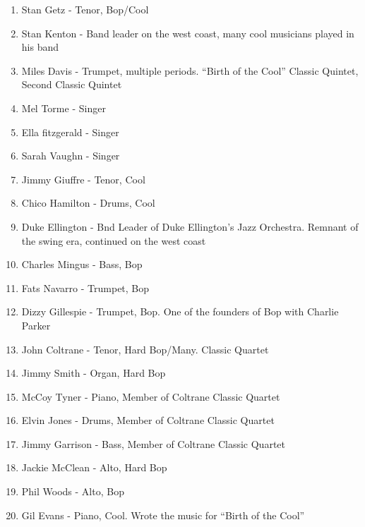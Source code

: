 \documentclass[]{article}
\begin{document}
\begin{enumerate}
\item
  Stan Getz - Tenor, Bop/Cool
\item
  Stan Kenton - Band leader on the west coast, many cool musicians
  played in his band
\item
  Miles Davis - Trumpet, multiple periods. ``Birth of the Cool'' Classic
  Quintet, Second Classic Quintet
\item
  Mel Torme - Singer
\item
  Ella fitzgerald - Singer
\item
  Sarah Vaughn - Singer
\item
  Jimmy Giuffre - Tenor, Cool
\item
  Chico Hamilton - Drums, Cool
\item
  Duke Ellington - Bnd Leader of Duke Ellington's Jazz Orchestra.
  Remnant of the swing era, continued on the west coast
\item
  Charles Mingus - Bass, Bop
\item
  Fats Navarro - Trumpet, Bop
\item
  Dizzy Gillespie - Trumpet, Bop. One of the founders of Bop with
  Charlie Parker
\item
  John Coltrane - Tenor, Hard Bop/Many. Classic Quartet
\item
  Jimmy Smith - Organ, Hard Bop
\item
  McCoy Tyner - Piano, Member of Coltrane Classic Quartet
\item
  Elvin Jones - Drums, Member of Coltrane Classic Quartet
\item
  Jimmy Garrison - Bass, Member of Coltrane Classic Quartet
\item
  Jackie McClean - Alto, Hard Bop
\item
  Phil Woods - Alto, Bop
\item
  Gil Evans - Piano, Cool. Wrote the music for ``Birth of the Cool''
\end{enumerate}
\end{document}
